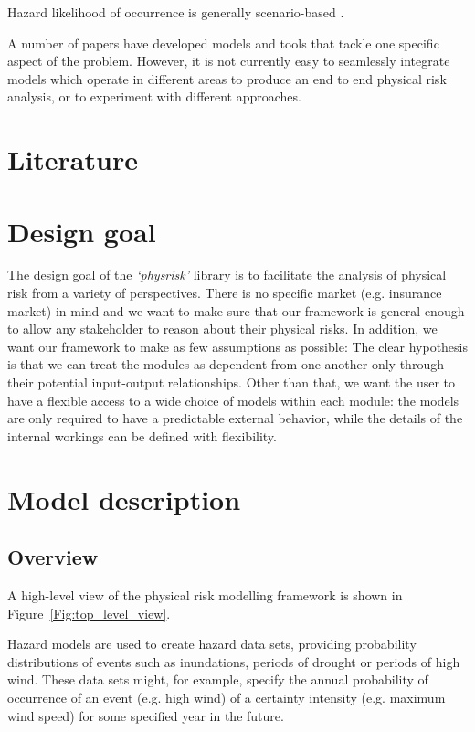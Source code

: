 \documentclass[a4paper,11pt]{extarticle} %
\begin{document}
Hazard likelihood of occurrence is generally scenario-based \cite{BertramEtAl:2020}. 

A number of papers have developed models and tools that tackle one specific aspect of the problem. However, it is not currently easy to seamlessly integrate models which operate in different areas to produce an end to end physical risk analysis, or to experiment with different approaches.


\section{Literature}

\section{Design goal}
The design goal of the \emph{`physrisk'} library is to facilitate the analysis of physical risk from a variety of perspectives. There is no specific market (e.g. insurance market) in mind and we want to make sure that our framework is general enough to allow any stakeholder to reason about their physical risks. In addition, we want our framework to make as few assumptions as possible: The clear hypothesis is that we can treat the modules as dependent from one another only through their potential input-output relationships. Other than that, we want the user to have a flexible access to a wide choice of models within each module: the models are only required to have a predictable external behavior, while the details of the internal workings can be defined with flexibility.

\section{Model description}

\subsection{Overview}
A high-level view of the physical risk modelling framework is shown in Figure~\ref{Fig:top_level_view}.

Hazard models are used to create hazard data sets, providing probability distributions of events such as inundations, periods of drought or periods of high wind. These data sets might, for example, specify the annual probability of occurrence of an event (e.g. high wind) of a certainty intensity (e.g. maximum wind speed) for some specified year in the future.
\end{document}
